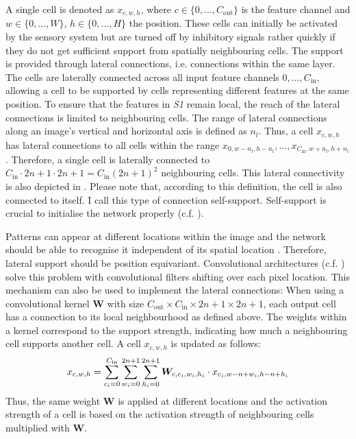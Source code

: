 A single cell is denoted as $x_{c,w,h}$, where $c \in \{0, ..., C_{\text{out}}\}$ is the feature channel and $w \in \{0, ..., W\}$, $h \in \{0, ..., H\}$ the position.
These cells can initially be activated by the sensory system but are turned off by inhibitory signals rather quickly if they do not get sufficient support from spatially neighbouring cells.
The support is provided through lateral connections, i.e. connections within the same layer.
The cells are laterally connected across all input feature channels $0, ..., C_{\text{in}}$, allowing a cell to be supported by cells representing different features at the same position.
To ensure that the features in \emph{S1} remain local, the reach of the lateral connections is limited to neighbouring cells. The range of lateral connections along an image's vertical and horizontal axis is defined as $n_{l}$.
Thus, a cell $x_{c,w,h}$ has lateral connections to all cells within the range $x_{0,w-n_l,h-n_l}, ..., x_{C_{\text{in}},w+n_l,h+n_l}$.
Therefore, a single cell is laterally connected to $C_{\text{in}} \cdot 2n+1 \cdot 2n+1 = C_{\text{in}} (2n+1)^2$ neighbouring cells.
This lateral connectivity is also depicted in . 
Please note that, according to this definition, the cell is also connected to itself.
I call this type of connection self-support.
Self-support is crucial to initialise the network properly (c.f. ).

Patterns can appear at different locations within the image and the network should be able to recognise it independent of its spatial location . 
Therefore, lateral support should be position equivariant.
Convolutional architectures (c.f. ) solve this problem with convolutional filters shifting over each pixel location. This mechanism can also be used to implement the lateral connections: When using a convolutional kernel $\boldsymbol{W}$ with size $C_{\text{out}} \times C_{\text{in}} \times 2n+1 \times 2n+1$, each output cell has a connection to its local neighbourhood as defined above.
The weights within a kernel correspond to the support strength, indicating how much a neighbouring cell supports another cell. A cell $x_{c,w,h}$ is updated as follows: 
%
\begin{align}\eqlbl{convlat_1}
	x_{c,w,h} = \sum_{c_i=0}^{C_{\text{in}}} \sum_{w_i=0}^{2n+1} \sum_{h_i=0}^{2n+1} \boldsymbol{W}_{c, c_i,w_i,h_i} \cdot x_{c_i,w-n+w_i,h-n+h_i}
\end{align}
%
Thus, the same weight $\boldsymbol{W}$ is applied at different locations and the activation strength of a cell is based on the activation strength of neighbouring cells multiplied with $\boldsymbol{W}$.



